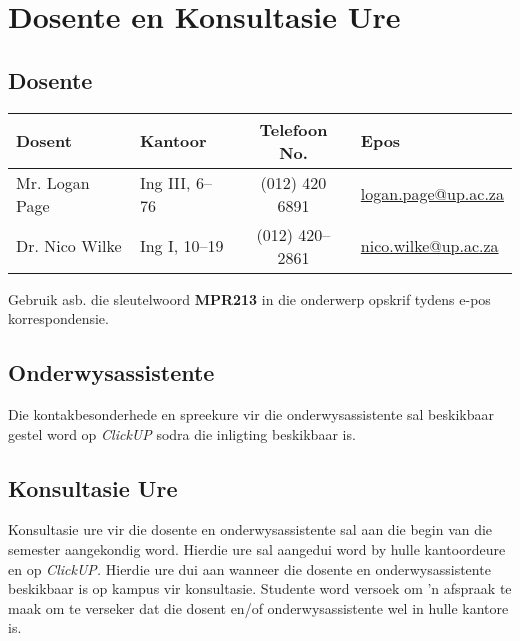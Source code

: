 \section{Dosente en Konsultasie Ure}
    \subsection{Dosente}
        \begin{table}[!h]
            \begin{center}
             \begin{tabular}{|l|l|c|l|}
                 \hline
                 {\bf Dosent} & {\bf Kantoor} & {\bf Telefoon No.} & {\bf Epos} \\
                 \hline
                 Mr. Logan Page &
                 Ing III, 6--76 &
                 (012) 420 6891 &
                 \href{mailto:logan.page@up.ac.za}{logan.page@up.ac.za} \\
                 Dr. Nico Wilke &
                 Ing I, 10--19 &
                 (012) 420--2861 &
                 \href{mailto:nico.wilke@up.ac.za}{nico.wilke@up.ac.za} \\
                 \hline
             \end{tabular}
            \end{center}
        \end{table}

      Gebruik asb. die sleutelwoord \textbf{MPR213} in die onderwerp
      opskrif tydens e-pos korrespondensie.
    
    \subsection{Onderwysassistente}
	Die kontakbesonderhede en spreekure vir die onderwysassistente sal
	beskikbaar gestel word op \textit{ClickUP} sodra die inligting beskikbaar is.
    
    \subsection{Konsultasie Ure}
        Konsultasie ure vir die dosente en onderwysassistente sal aan die begin 
        van die semester aangekondig word.  Hierdie ure sal aangedui word by 
        hulle kantoordeure en op \textit{ClickUP.}  Hierdie ure dui aan wanneer die 
        dosente en onderwysassistente beskikbaar is op kampus vir konsultasie.
        Studente word versoek om 'n afspraak te maak om te verseker dat die 
        dosent en/of onderwysassistente wel in hulle kantore is.
        
